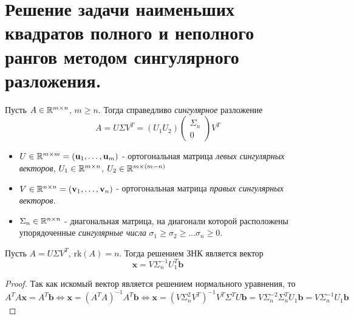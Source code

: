 \section{Решение задачи наименьших квадратов полного и неполного рангов методом сингулярного разложения.}

\begin{definition}
  Пусть $A\in\mathbb{R}^{m\times n}$, $m\geq n$. Тогда справедливо \textit{сингулярное} разложение
  \[A=U\Sigma V^T=(U_1U_2)\left(\begin{array}{c}
        \Sigma_n \\ 0
      \end{array}\right)V^T\]
  \begin{itemize}
    \item $U\in\mathbb{R}^{m\times m}=(\mathbf{u}_1,\ldots,\mathbf{u}_m)$ - ортогональная матрица \textit{левых сингулярных векторов}, $U_1\in\mathbb{R}^{m\times n}$, $U_2\in\mathbb{R}^{m\times (m-n)}$
    \item $V\in\mathbb{R}^{n\times n}=(\mathbf{v}_1,\ldots,\mathbf{v}_n)$ - ортогональная матрица \textit{правых сингулярных векторов}.
    \item $\Sigma_n\in\mathbb{R}^{n\times n}$ - диагональная матрица,
          на диагонали которой расположены упорядоченные \textit{сингулярные числа} $\sigma_1\geq\sigma_2\geq\ldots\sigma_n\geq0$.
  \end{itemize}
\end{definition}

\begin{theorem}
  Пусть $A=U\Sigma V^T$, $\text{rk}(A)=n$. Тогда решением ЗНК является вектор
  \[\mathbf{x}=V\Sigma_n^{-1}U_1^T\mathbf{b}\]
\end{theorem}
\begin{proof}
  Так как искомый вектор является решением нормального уравнения, то
  \[A^TA\mathbf{x}=A^T\mathbf{b}\Leftrightarrow \mathbf{x}=(A^TA)^{-1}A^T\mathbf{b}\Leftrightarrow \mathbf{x}=(V\Sigma_n^2V^T)^{-1}V^T\Sigma^T U\mathbf{b}=V\Sigma_n^{-2}\Sigma_n^T U_1\mathbf{b}=V\Sigma_n^{-1}U_1\mathbf{b}\]
\end{proof}

